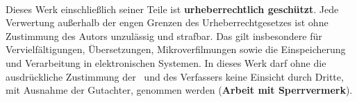 \begin{titlepage}
\begin{center}
		\textcopyright\ \jahr\\[1.5ex]
	\end{center}

	\singlespacing
	\small
	\noindent Dieses Werk einschließlich seiner Teile ist \textbf{urheberrechtlich geschützt}. Jede Verwertung außerhalb der engen Grenzen des Urheberrechtgesetzes ist ohne Zustimmung des Autors unzulässig und strafbar. Das gilt insbesondere für Vervielfältigungen, Übersetzungen, Mikroverfilmungen sowie die Einspeicherung und Verarbeitung in elektronischen Systemen. In dieses Werk darf ohne die ausdrückliche Zustimmung der \ewe\ und des Verfassers keine Einsicht durch Dritte, mit Ausnahme der Gutachter, genommen werden (\textbf{Arbeit mit Sperrvermerk}).
	
\end{titlepage}
